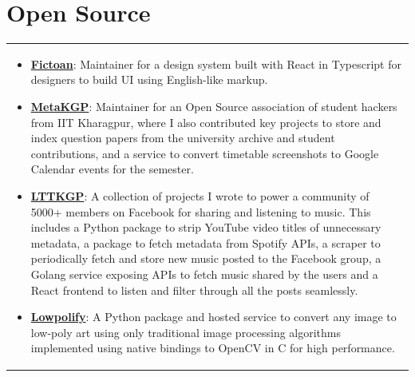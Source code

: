 \documentclass[a4paper,10pt]{extarticle} %
\begin{document}

\section{\textcolor{primary}{Open Source}}
\begin{tabularx}{\linewidth}{X}
\begin{itemize}[leftmargin=*, nosep, before=\vspace{-0.8\baselineskip}, after=\vspace{-1.0\baselineskip}]
    \item \textbf{\href{https://github.com/fictoan/fictoan-react}{Fictoan}}: Maintainer for a design system built with React in Typescript for designers to build UI using English-like markup.
    \item \textbf{\href{https://wiki.metakgp.org}{MetaKGP}}: Maintainer for an Open Source association of student hackers from IIT Kharagpur, where I also contributed key projects to store and index question papers from the university archive and student contributions, and a service to convert timetable screenshots to Google Calendar events for the semester.
    \item \textbf{\href{https://github.com/lttkgp}{LTTKGP}}: A collection of projects I wrote to power a community of 5000+ members on Facebook for sharing and listening to music. This includes a Python package to strip YouTube video titles of unnecessary metadata, a package to fetch metadata from Spotify APIs, a scraper to periodically fetch and store new music posted to the Facebook group, a Golang service exposing APIs to fetch music shared by the users and a React frontend to listen and filter through all the posts seamlessly.
    \item \textbf{\href{https://github.com/ghostwriternr/lowpolify}{Lowpolify}}: A Python package and hosted service to convert any image to low-poly art using only traditional image processing algorithms implemented using native bindings to OpenCV in C for high performance.
\end{itemize}
\end{tabularx}

\end{document}
